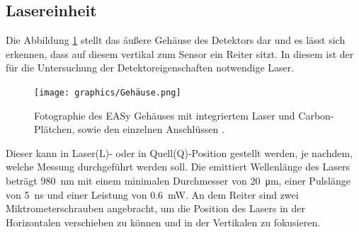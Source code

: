 \FloatBarrier
\subsection{Lasereinheit}
\label{sec:Lasereinheit}
Die Abbildung \ref{fig:Gehäuse} stellt das äußere Gehäuse des Detektors dar und es lässt sich erkennen, dass auf diesem vertikal zum Sensor ein Reiter sitzt. In diesem ist der für die Untersuchung der Detektoreigenschaften notwendige Laser.
\begin{figure}[htb]
  \centering
  \texttt{[image: graphics/Gehäuse.png]}
  \caption{Fotographie des EASy Gehäuses mit integriertem Laser und Carbon-Plätchen,
  sowie den einzelnen Anschlüssen \cite{anleitung}.}
  \label{fig:Gehäuse}
\end{figure}
Dieser kann in Laser(L)- oder in Quell(Q)-Position
gestellt werden, je nachdem, welche Messung durchgeführt werden soll.
Die emittiert Wellenlänge des Lasers beträgt \SI{980}{\nano\meter}
mit einem minimalen Durchmesser von \SI{20}{\micro\meter}, einer Pulslänge von
\SI{5}{\nano\second} und einer Leistung von \SI{0.6}{\milli\watt}.
An dem Reiter sind zwei Miktrometerschrauben angebracht, um die Position des Lasers in der Horizontalen verschieben zu können und in der Vertikalen zu fokusieren.

\FloatBarrier
